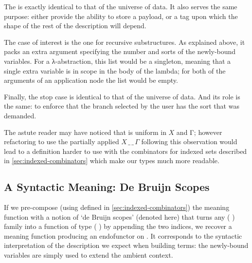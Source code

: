 The  is exactly identical to that of the universe of data. It
also serves the same purpose: either provide the ability to store a
payload, or a tag upon which the shape of the rest of the description
will depend.

\begin{AgdaSuppressSpace}
\end{AgdaSuppressSpace}

The case of interest is the one for recursive substructures. As explained
above, it packs an extra argument specifying the number and sorts of the
newly-bound variables. For a λ-abstraction, this list would be a singleton,
meaning that a single extra variable is in scope in the body of the lambda;
for both of the arguments of an application node the list would be empty.

\begin{AgdaSuppressSpace}
\end{AgdaSuppressSpace}

Finally, the stop case is identical to that of the universe of data.
And its role is the same: to enforce that the branch selected by the
user has the sort that was demanded.

\begin{AgdaSuppressSpace}
\end{AgdaSuppressSpace}

The astute reader may have noticed that  is uniform in $X$
and Γ; however refactoring  to use the partially applied
$X\,\_\,\_\,\Gamma$ following this observation would lead to
a definition harder to use with the combinators for indexed sets
described in \cref{sec:indexed-combinators} which make our types
much more readable.


\subsection{A Syntactic Meaning: De Bruijn Scopes}

If we pre-compose (using  defined in \cref{sec:indexed-combinators})
the meaning function  with a notion of
`de Bruijn scopes' (denoted  here) that turns any
{( )} family into a function
of type {(    )} by appending the two
 indices, we recover a meaning function producing an endofunctor on
 . It corresponds to the syntactic interpretation of
the description we expect when building terms: the newly-bound variables
are simply used to extend the ambient context.

